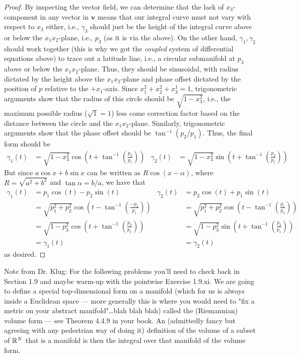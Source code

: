 \documentclass[../psets.tex]{subfiles}
\begin{document}
\begin{enumerate}[label={\textbf{4.3.\roman*.}}]
\begin{enumerate}
\begin{proof}
            By inspecting the vector field, we can determine that the lack of $x_3$-component in any vector in $\bm{v}$ means that our integral curve must not vary with respect to $x_3$ either, i.e., $\gamma_3$ should just be the height of the integral curve above or below the $x_1x_2$-plane, i.e., $p_3$ (as it is via the above). On the other hand, $\gamma_1,\gamma_2$ should work together (this is why we got the \emph{coupled} system of differential equations above) to trace out a latitude line, i.e., a circular submanifold at $p_3$ above or below the $x_1x_2$-plane. Thus, they should be sinusoidal, with radius dictated by the height above the $x_1x_2$-plane and phase offset dictated by the position of $p$ relative to the $+x_1$-axis. Since $x_1^2+x_2^2+x_3^1=1$, trigonometric arguments show that the radius of this circle should be $\sqrt{1-x_3^2}$, i.e., the maximum possible radius ($\sqrt{1}=1$) less come correction factor based on the distance between the circle and the $x_1x_2$-plane. Similarly, trigonometric arguments show that the phase offset should be $\tan^{-1}(p_2/p_1)$. Thus, the final form should be
            \begin{align*}
                \gamma_1(t) &= \sqrt{1-x_3^2}\cos\left( t+\tan^{-1}\left( \frac{p_2}{p_1} \right) \right)&
                \gamma_2(t) &= \sqrt{1-x_3^2}\sin\left( t+\tan^{-1}\left( \frac{p_2}{p_1} \right) \right)
            \end{align*}
            But since $a\cos x+b\sin x$ can be written as $R\cos(x-\alpha)$, where $R=\sqrt{a^2+b^2}$ and $\tan\alpha=b/a$, we have that
            \begin{align*}
                \gamma_1(t) &= p_1\cos(t)-p_2\sin(t)&
                    \gamma_2(t) &= p_2\cos(t)+p_1\sin(t)\\
                &= \sqrt{p_1^2+p_2^2}\cos\left( t-\tan^{-1}\left( \frac{-p_2}{p_1} \right) \right)&
                    &= \sqrt{p_1^2+p_2^2}\cos\left( t-\tan^{-1}\left( \frac{p_1}{p_2} \right) \right)\\
                &= \sqrt{1-p_3^2}\cos\left( t+\tan^{-1}\left( \frac{p_2}{p_1} \right) \right)&
                    &= \sqrt{1-p_3^2}\sin\left( t+\tan^{-1}\left( \frac{p_2}{p_1} \right) \right)\\
                &= \gamma_1(t)&
                    &= \gamma_2(t)
            \end{align*}
            as desired.
        \end{proof}
    \end{enumerate}
\end{enumerate}
Note from Dr. Klug: For the following problems you'll need to check back in Section 1.9 and maybe warm-up with the pointwise Exercise 1.9.xi. We are going to define a special top-dimensional form on a manifold (which for us is always inside a Euclidean space --- more generally this is where you would need to "fix a metric on your abstract manifold"\dots blah blah blah) called the (Riemannian) volume form --- see Theorem 4.4.9 in your book. An (admittedly fancy but agreeing with any pedestrian way of doing it) definition of the volume of a subset of $\mathbb{R}^N$ that is a manifold is then the integral over that manifold of the volume form.
\end{document}
